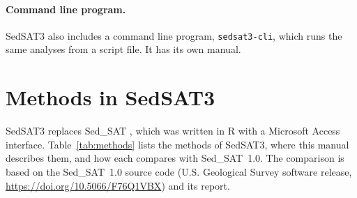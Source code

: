 \documentclass[12pt]{report}
\begin{document}
\paragraph{Command line program.} SedSAT3 also includes a command line program, \texttt{sedsat3-cli}, which runs the same analyses from a script file. It has its own manual.

\section{Methods in SedSAT3}\label{sec:methods-table}
SedSAT3 replaces Sed\_SAT \citep{gormansanisaca2017determining}, which was written in R with a Microsoft Access interface. Table~\ref{tab:methods} lists the methods of SedSAT3, where this manual describes them, and how each compares with Sed\_SAT~1.0. The comparison is based on the Sed\_SAT~1.0 source code (U.S. Geological Survey software release, \url{https://doi.org/10.5066/F76Q1VBX}) and its report.
\end{document}
